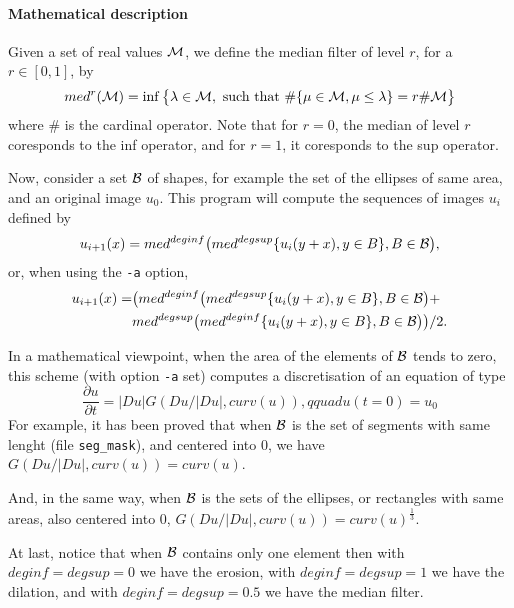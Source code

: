 
\paragraph{Mathematical description} \mbox{}

Given a set of real values $\cal M$, we define the median filter of level $r$, for a $r \in [0,1]$, by
$$ med^r({\cal M}) = \inf \big\{\lambda \in {\cal M}, 
\hbox{ such that }  \#\{ \mu \in {\cal M}, \mu \leq \lambda \} = r
 \#{\cal M} \big\}$$
where $\#$ is the cardinal operator.
Note that for $r=0$, the median of level $r$ coresponds to the inf operator, 
and for $r=1$, it coresponds to the sup operator.

Now, consider a set $\cal B$ of shapes, for example the set of the ellipses of same area, and an original image $u_0$.
This program will compute the sequences of images $u_i$ defined by
\[
u_{i+1}(x) = med^{deginf}\big( med^{degsup} \{u_{i}(y+x), y \in B \},
B \in {\cal B} \big),
\]
or, when using the \verb+-a+ option,
\begin{eqnarray*}
u_{i+1}(x) = & \big( med^{deginf}\big( med^{degsup} \{u_{i}(y+x), y \in B \},
B \in {\cal B} \big) + \\
& med^{degsup}\big( med^{deginf} \{u_{i}(y+x), y \in B \}, B \in {\cal B} \big) \big)
/2.
\end{eqnarray*}


In a mathematical viewpoint, when the area of the elements of ${\cal B}$ tends
to zero, this scheme (with option \verb+-a+ set) 
computes a discretisation of an equation of type
$$ \frac{\partial u}{\partial t} = |Du| G( Du/|Du|, curv(u)), qquad u(t=0)= u_0 $$
For example, it has been proved that when $\cal B$ is the set of
segments with same lenght (file \verb+seg_mask+), and centered into 0, 
we have $G( Du/|Du|, curv(u)) = curv(u)$.

And, in the same way, when $\cal B$ is the sets of the ellipses, or 
rectangles with same areas, also centered into 0, 
$G( Du/|Du|, curv(u)) = curv(u)^\frac{1}{3}$.

At last, notice that when $\cal B$ contains only one element then with $deginf = degsup = 0$ we have the erosion, with $deginf = degsup = 1$ we have the dilation, and with $deginf= degsup= 0.5$ we have the median filter.

